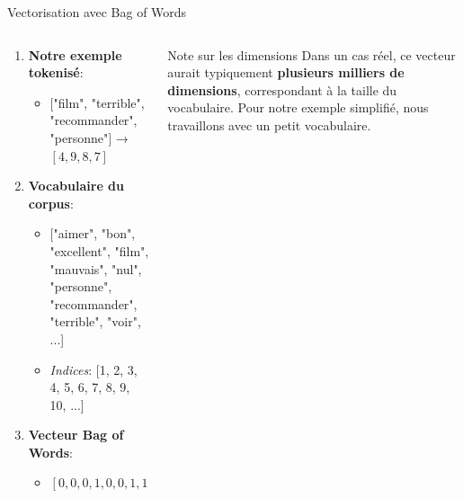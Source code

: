 \documentclass[aspectratio=169,11pt]{beamer}
\begin{document}
\begin{frame}{Vectorisation avec Bag of Words}
    \begin{columns}
        \begin{column}{0.5\textwidth}
            \begin{enumerate}
                \item \textbf{Notre exemple tokenisé}:
                \begin{itemize}
                    \item $[$"film", "terrible", "recommander", "personne"$]$ → $[4, 9, 8, 7]$
                \end{itemize}
                \vspace{0.4cm}
                \item \textbf{Vocabulaire du corpus}:
                \begin{itemize}
                    \item $[$"aimer", "bon", "excellent", "film", "mauvais", "nul", "personne", "recommander", "terrible", "voir", ...] 
                    \item \textit{Indices}: [1, 2, 3, 4, 5, 6, 7, 8, 9, 10, ...]
                \end{itemize}
                \vspace{0.4cm}
                \item \textbf{Vecteur Bag of Words}:
                \begin{itemize}
                    \item $[0, 0, 0, 1, 0, 0, 1, 1, 1, 0, ...]$
                \end{itemize}
            \end{enumerate}
        \end{column}
        \begin{column}{0.5\textwidth}
            \vspace{-0.5cm}
            \begin{center}
                \begin{alertblock}{Note sur les dimensions}
        Dans un cas réel, ce vecteur aurait typiquement \textbf{plusieurs milliers de dimensions}, correspondant à la taille du vocabulaire. Pour notre exemple simplifié, nous travaillons avec un petit vocabulaire.
                \end{alertblock}
            \end{center}
        \end{column}
    \end{columns}
    

\end{frame}
\end{document}

